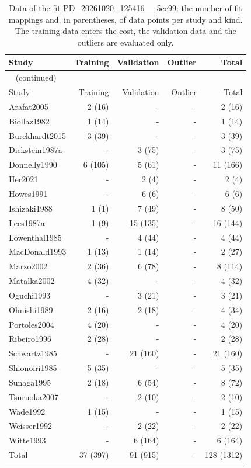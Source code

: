 \documentclass{article}
\begin{document}
\begin{longtable}{lrrrr}
\caption{Data of the fit PD\_20261020\_125416\_\_5ce99: the number of fit mappings and, in parentheses, of data points per study and kind. The training data enters the cost, the validation data and the outliers are evaluated only.}\label{tab:data:PD_20261020_125416__5ce99} \\
\toprule
Study & Training & Validation & Outlier & Total \\
\midrule
\endfirsthead
\multicolumn{5}{l}{\small\tablename~\thetable{} (continued)} \\
\toprule
Study & Training & Validation & Outlier & Total \\
\midrule
\endhead
\bottomrule
\endlastfoot
Arafat2005 & 2 (16) & - & - & 2 (16) \\
Biollaz1982 & 1 (14) & - & - & 1 (14) \\
Burckhardt2015 & 3 (39) & - & - & 3 (39) \\
Dickstein1987a & - & 3 (75) & - & 3 (75) \\
Donnelly1990 & 6 (105) & 5 (61) & - & 11 (166) \\
Her2021 & - & 2 (4) & - & 2 (4) \\
Howes1991 & - & 6 (6) & - & 6 (6) \\
Ishizaki1988 & 1 (1) & 7 (49) & - & 8 (50) \\
Lees1987a & 1 (9) & 15 (135) & - & 16 (144) \\
Lowenthal1985 & - & 4 (44) & - & 4 (44) \\
MacDonald1993 & 1 (13) & 1 (14) & - & 2 (27) \\
Marzo2002 & 2 (36) & 6 (78) & - & 8 (114) \\
Matalka2002 & 4 (32) & - & - & 4 (32) \\
Oguchi1993 & - & 3 (21) & - & 3 (21) \\
Ohnishi1989 & 2 (16) & 2 (18) & - & 4 (34) \\
Portoles2004 & 4 (20) & - & - & 4 (20) \\
Ribeiro1996 & 2 (28) & - & - & 2 (28) \\
Schwartz1985 & - & 21 (160) & - & 21 (160) \\
Shionoiri1985 & 5 (35) & - & - & 5 (35) \\
Sunaga1995 & 2 (18) & 6 (54) & - & 8 (72) \\
Tsuruoka2007 & - & 2 (10) & - & 2 (10) \\
Wade1992 & 1 (15) & - & - & 1 (15) \\
Weisser1992 & - & 2 (22) & - & 2 (22) \\
Witte1993 & - & 6 (164) & - & 6 (164) \\
Total & 37 (397) & 91 (915) & - & 128 (1312) \\
\end{longtable}
\end{document}
